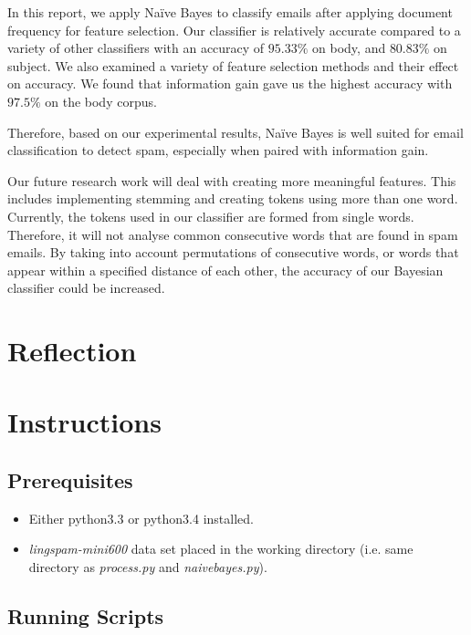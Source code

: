 \documentclass[10pt, a4paper]{article}
\begin{document}
In this report, we apply Na\"ive Bayes to classify emails after applying document frequency for feature selection. Our classifier is relatively accurate compared to a variety of other classifiers with an accuracy of $95.33\%$ on body, and $80.83\%$ on subject. We also examined a variety of feature selection methods and their effect on accuracy. We found that information gain gave us the highest accuracy with $97.5\%$ on the body corpus.

Therefore, based on our experimental results, Na\"ive Bayes is well suited for email classification to detect spam, especially when paired with information gain. 

Our future research work will deal with creating more meaningful features. This includes implementing stemming and creating tokens using more than one word. Currently, the tokens used in our classifier are formed from single words. Therefore, it will not analyse common consecutive words that are found in spam emails. By taking into account permutations of consecutive words, or words that appear within a specified distance of each other, the accuracy of our Bayesian classifier could be increased.

\section{Reflection}

\section{Instructions}

\subsection{Prerequisites}

\begin{itemize}
\item Either python3.3 or python3.4 installed.
\item \textit{lingspam-mini600} data set placed in the working directory (i.e. same directory as \textit{process.py} and \textit{naivebayes.py}).
\end{itemize}

\subsection{Running Scripts}
\end{document}
